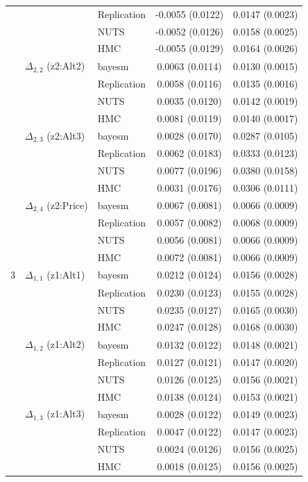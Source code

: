 \begin{longtable}{cllcc}
 &  & Replication & -0.0055 (0.0122) & 0.0147 (0.0023) \\
 &  & NUTS & -0.0052 (0.0126) & 0.0158 (0.0025) \\
 &  & HMC & -0.0055 (0.0129) & 0.0164 (0.0026) \\
 & $\Delta_{2,2}$ (z2:Alt2) & bayesm & 0.0063 (0.0114) & 0.0130 (0.0015) \\
 &  & Replication & 0.0058 (0.0116) & 0.0135 (0.0016) \\
 &  & NUTS & 0.0035 (0.0120) & 0.0142 (0.0019) \\
 &  & HMC & 0.0081 (0.0119) & 0.0140 (0.0017) \\
 & $\Delta_{2,3}$ (z2:Alt3) & bayesm & 0.0028 (0.0170) & 0.0287 (0.0105) \\
 &  & Replication & 0.0062 (0.0183) & 0.0333 (0.0123) \\
 &  & NUTS & 0.0077 (0.0196) & 0.0380 (0.0158) \\
 &  & HMC & 0.0031 (0.0176) & 0.0306 (0.0111) \\
 & $\Delta_{2,4}$ (z2:Price) & bayesm & 0.0067 (0.0081) & 0.0066 (0.0009) \\
 &  & Replication & 0.0057 (0.0082) & 0.0068 (0.0009) \\
 &  & NUTS & 0.0056 (0.0081) & 0.0066 (0.0009) \\
 &  & HMC & 0.0072 (0.0081) & 0.0066 (0.0009) \\
3 & $\Delta_{1,1}$ (z1:Alt1) & bayesm & 0.0212 (0.0124) & 0.0156 (0.0028) \\
 &  & Replication & 0.0230 (0.0123) & 0.0155 (0.0028) \\
 &  & NUTS & 0.0235 (0.0127) & 0.0165 (0.0030) \\
 &  & HMC & 0.0247 (0.0128) & 0.0168 (0.0030) \\
 & $\Delta_{1,2}$ (z1:Alt2) & bayesm & 0.0132 (0.0122) & 0.0148 (0.0021) \\
 &  & Replication & 0.0127 (0.0121) & 0.0147 (0.0020) \\
 &  & NUTS & 0.0126 (0.0125) & 0.0156 (0.0021) \\
 &  & HMC & 0.0138 (0.0124) & 0.0153 (0.0021) \\
 & $\Delta_{1,3}$ (z1:Alt3) & bayesm & 0.0028 (0.0122) & 0.0149 (0.0023) \\
 &  & Replication & 0.0047 (0.0122) & 0.0147 (0.0023) \\
 &  & NUTS & 0.0024 (0.0126) & 0.0156 (0.0025) \\
 &  & HMC & 0.0018 (0.0125) & 0.0156 (0.0025) \\

\end{longtable}

